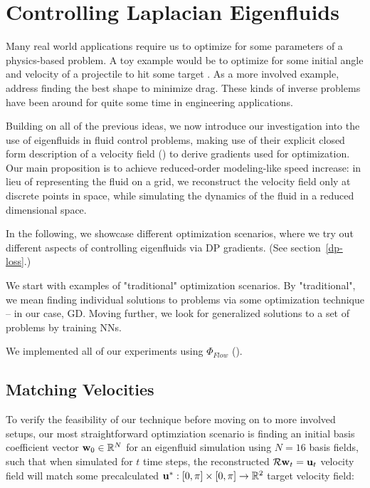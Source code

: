 \chapter{Controlling Laplacian Eigenfluids}
Many real world applications require us to optimize for some parameters of
a physics-based problem. A toy example would be to optimize for some initial
angle and velocity of a projectile to hit some target . As a more involved example, \cite{MinDrag} address
finding the best shape to minimize drag. These kinds of inverse problems have
been around for quite some time in engineering applications.

Building on all of the previous ideas, we now introduce our investigation into
the use of eigenfluids in fluid control problems, making use of their explicit
closed form description of a velocity field () to derive
gradients used for optimization. Our main proposition is to achieve
reduced-order modeling-like speed increase: in lieu of representing the fluid on
a grid, we reconstruct the velocity field only at discrete points in space,
while simulating the dynamics of the fluid in a reduced dimensional
space.

In the following, we showcase different optimization scenarios, where we try out
different aspects of controlling eigenfluids via \acf{DP} gradients. (See
section~\ref{dp-loss}.)

We start with examples of "traditional" optimization scenarios. By
"traditional", we mean finding individual solutions to problems via some
optimization technique -- in our case, \acf{GD}. Moving further, we look for
generalized solutions to a set of problems by training \acfp{NN}.

We implemented all of our experiments using $\Phi_{Flow}$
(\cite{holl2019pdecontrol}).

\section{Matching Velocities}\label{section:matching-velocities}
To verify the feasibility of our technique before moving on to more involved
setups, our most straightforward optimziation scenario is finding an initial
basis coefficient vector $\vb{w}_0 \in \mathbb{R}^N$ for an eigenfluid
simulation using $N=16$ basis fields, such that when simulated for $t$ time
steps, the reconstructed $\mathcal{R}\vb{w}_t = \vb{u}_t$ velocity
field will match some precalculated $\vb{u}^*: [0,\pi]\times[0,\pi] \to
\mathbb{R}^2$ target velocity field:

